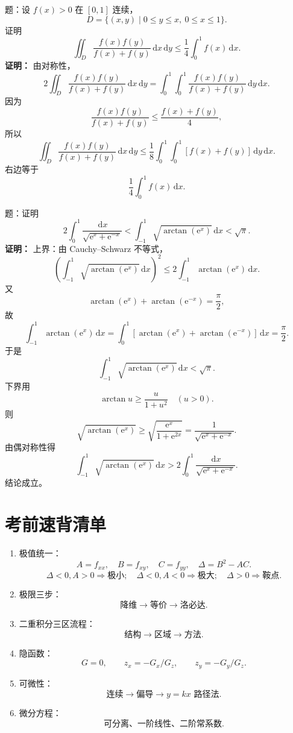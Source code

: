 \documentclass[11pt,a4paper,UTF8]{ctexart}
\newcommand{\dd}{\,\mathrm d}
\newcommand{\ee}{\mathrm e}
\begin{document}
\begin{answerbox}
题：设 \(f(x)>0\) 在 \([0,1]\) 连续，
\[
D=\{(x,y)\mid 0\le y\le x,\ 0\le x\le1\}.
\]
证明
\[
\iint_D\frac{f(x)f(y)}{f(x)+f(y)}\dd x\dd y
\le\frac14\int_0^1f(x)\dd x.
\]
\textbf{证明：}
由对称性，
\[
2\iint_D\frac{f(x)f(y)}{f(x)+f(y)}\dd x\dd y
=\int_0^1\int_0^1\frac{f(x)f(y)}{f(x)+f(y)}\dd y\dd x.
\]
因为
\[
\frac{f(x)f(y)}{f(x)+f(y)}
\le \frac{f(x)+f(y)}4,
\]
所以
\[
\iint_D\frac{f(x)f(y)}{f(x)+f(y)}\dd x\dd y
\le
\frac18\int_0^1\int_0^1[f(x)+f(y)]\dd y\dd x.
\]
右边等于
\[
\boxed{\frac14\int_0^1f(x)\dd x}.
\]
\end{answerbox}

\begin{answerbox}
题：证明
\[
2\int_0^1\frac{\dd x}{\sqrt{\ee^x+\ee^{-x}}}
<
\int_{-1}^{1}\sqrt{\arctan(\ee^x)}\dd x
<\sqrt{\pi}.
\]
\textbf{证明：}
上界：由 Cauchy--Schwarz 不等式，
\[
\left(\int_{-1}^{1}\sqrt{\arctan(\ee^x)}\dd x\right)^2
\le 2\int_{-1}^{1}\arctan(\ee^x)\dd x.
\]
又
\[
\arctan(\ee^x)+\arctan(\ee^{-x})=\frac\pi2,
\]
故
\[
\int_{-1}^{1}\arctan(\ee^x)\dd x
=\int_0^1\left[\arctan(\ee^x)+\arctan(\ee^{-x})\right]\dd x
=\frac\pi2.
\]
于是
\[
\int_{-1}^{1}\sqrt{\arctan(\ee^x)}\dd x<\sqrt\pi.
\]
下界用
\[
\arctan u\ge \frac{u}{1+u^2}\quad (u>0).
\]
则
\[
\sqrt{\arctan(\ee^x)}
\ge
\sqrt{\frac{\ee^x}{1+\ee^{2x}}}
=\frac{1}{\sqrt{\ee^x+\ee^{-x}}}.
\]
由偶对称性得
\[
\int_{-1}^{1}\sqrt{\arctan(\ee^x)}\dd x
>
2\int_0^1\frac{\dd x}{\sqrt{\ee^x+\ee^{-x}}}.
\]
结论成立。
\end{answerbox}
\section{考前速背清单}

\begin{scorebox}[必须背熟]
\begin{enumerate}[label=\arabic*.]
\item 极值统一：
\[
A=f_{xx},\quad B=f_{xy},\quad C=f_{yy},\quad \Delta=B^2-AC.
\]
\[
\Delta<0,A>0\Rightarrow \text{极小};\quad
\Delta<0,A<0\Rightarrow \text{极大};\quad
\Delta>0\Rightarrow \text{鞍点}.
\]

\item 极限三步：
\[
\text{降维}\to\text{等价}\to\text{洛必达}.
\]

\item 二重积分三区流程：
\[
\text{结构}\to\text{区域}\to\text{方法}.
\]

\item 隐函数：
\[
G=0,\qquad z_x=-G_x/G_z,\qquad z_y=-G_y/G_z.
\]

\item 可微性：
\[
\text{连续}\to\text{偏导}\to y=kx\text{ 路径法}.
\]

\item 微分方程：
\[
\text{可分离、一阶线性、二阶常系数}.
\]
\end{enumerate}
\end{scorebox}
\end{document}
